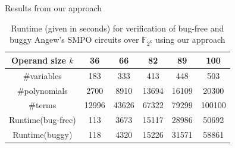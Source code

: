 \documentclass[xcolor=dvipsnames]{beamer}
\newcommand{\Fkk}{{\mathbb{F}}_{2^k}}
\begin{document}
\begin{frame}{\large{Results from our approach}}
\begin{table}[H]
\centering
\begin{tabular}{|c||c|c|c|c|c|} 
\hline
Operand size $k$ & 36 & 66 & 82 & 89 & 100 \\
\hline
\#variables & 183 & 333 & 413 & 448 & 503\\
\hline
\#polynomials & 2700 & 8910 & 13694 & 16109 & 20300\\
\hline
\#terms & 12996 & 43626 & 67322 & 79299 & 100100 \\
\hline
\hline
Runtime(bug-free) & 113 & 3673 & 15117 & 28986 & 50692 \\
\hline
Runtime(buggy) & 118 & 4320 & 15226 & 31571 & 58861\\
\hline
\end{tabular}
\caption{Runtime (given in seconds) for verification of bug-free and buggy Angew's SMPO circuits over $\Fkk$ using our approach}\label{table:SMPO}  
\end{table}
\end{frame}
\end{document}
